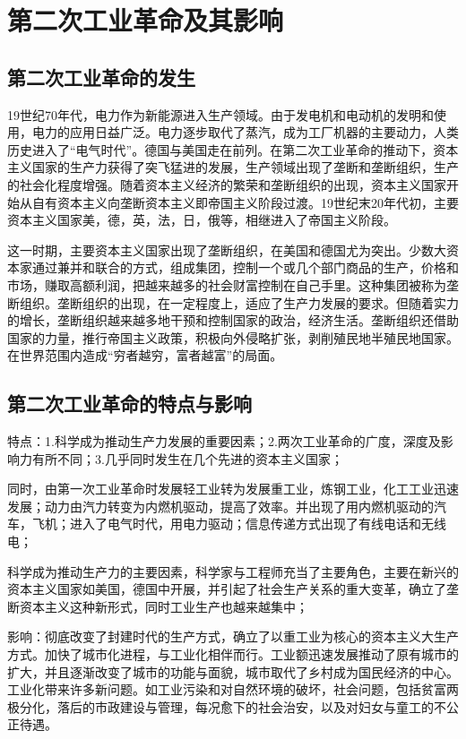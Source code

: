 \section{第二次工业革命及其影响}

\subsection{第二次工业革命的发生}
19世纪70年代，电力作为新能源进入生产领域。由于发电机和电动机的发明和使用，电力的应用日益广泛。电力逐步取代了蒸汽，成为工厂机器的主要动力，人类历史进入了“电气时代”。德国与美国走在前列。在第二次工业革命的推动下，资本主义国家的生产力获得了突飞猛进的发展，生产领域出现了垄断和垄断组织，生产的社会化程度增强。随着资本主义经济的繁荣和垄断组织的出现，资本主义国家开始从自有资本主义向垄断资本主义即帝国主义阶段过渡。19世纪末20年代初，主要资本主义国家美，德，英，法，日，俄等，相继进入了帝国主义阶段。

这一时期，主要资本主义国家出现了垄断组织，在美国和德国尤为突出。少数大资本家通过兼并和联合的方式，组成集团，控制一个或几个部门商品的生产，价格和市场，赚取高额利润，把越来越多的社会财富控制在自己手里。这种集团被称为垄断组织。垄断组织的出现，在一定程度上，适应了生产力发展的要求。但随着实力的增长，垄断组织越来越多地干预和控制国家的政治，经济生活。垄断组织还借助国家的力量，推行帝国主义政策，积极向外侵略扩张，剥削殖民地半殖民地国家。在世界范围内造成“穷者越穷，富者越富”的局面。

\subsection{第二次工业革命的特点与影响}
特点：1.科学成为推动生产力发展的重要因素；2.两次工业革命的广度，深度及影响力有所不同；3.几乎同时发生在几个先进的资本主义国家；

同时，由第一次工业革命时发展轻工业转为发展重工业，炼钢工业，化工工业迅速发展；动力由汽力转变为内燃机驱动，提高了效率。并出现了用内燃机驱动的汽车，飞机；进入了电气时代，用电力驱动；信息传递方式出现了有线电话和无线电；

科学成为推动生产力的主要因素，科学家与工程师充当了主要角色，主要在新兴的资本主义国家如美国，德国中开展，并引起了社会生产关系的重大变革，确立了垄断资本主义这种新形式，同时工业生产也越来越集中；

影响：彻底改变了封建时代的生产方式，确立了以重工业为核心的资本主义大生产方式。加快了城市化进程，与工业化相伴而行。工业额迅速发展推动了原有城市的扩大，并且逐渐改变了城市的功能与面貌，城市取代了乡村成为国民经济的中心。工业化带来许多新问题。如工业污染和对自然环境的破坏，社会问题，包括贫富两极分化，落后的市政建设与管理，每况愈下的社会治安，以及对妇女与童工的不公正待遇。

